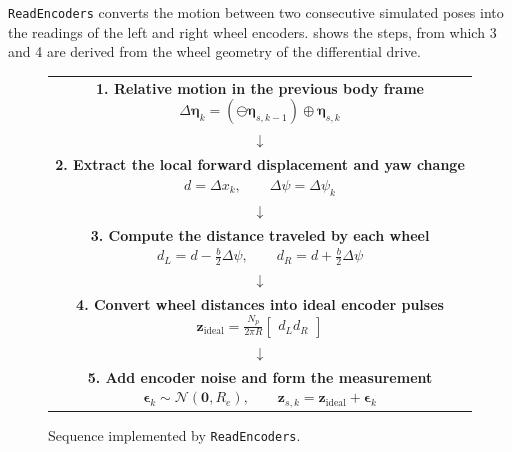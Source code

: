 \documentclass[letterpaper,12pt]{article}
\newcommand{\opluspose}{\mathbin{\oplus}}
\newcommand{\ominuspose}{\mathbin{\ominus}}
\begin{document}
\texttt{ReadEncoders} converts the motion between two consecutive simulated
poses into the readings of the left and right wheel encoders.
 shows the steps, from which 3 and 4 are derived from the wheel geometry of the
differential drive.

\begin{figure}[H]
    \centering
    \small
    \begin{tabular}{c}
        \fbox{\parbox{0.82\textwidth}{\centering
        \textbf{1. Relative motion in the previous body frame}\\[-0.1em]
        $\displaystyle
        \Delta\boldsymbol{\eta}_k=
        (\ominuspose\boldsymbol{\eta}_{s,k-1})
        \opluspose\boldsymbol{\eta}_{s,k}$}}\\[0.25em]
        $\downarrow$\\[0.25em]
        \fbox{\parbox{0.82\textwidth}{\centering
        \textbf{2. Extract the local forward displacement and yaw change}\\[-0.1em]
        $\displaystyle d=\Delta x_k,\qquad
        \Delta\psi=\Delta\psi_k$}}\\[0.25em]
        $\downarrow$\\[0.25em]
        \fbox{\parbox{0.82\textwidth}{\centering
        \textbf{3. Compute the distance traveled by each wheel}\\[-0.1em]
        $\displaystyle d_L=d-\frac{b}{2}\Delta\psi,\qquad
        d_R=d+\frac{b}{2}\Delta\psi$}}\\[0.25em]
        $\downarrow$\\[0.25em]
        \fbox{\parbox{0.82\textwidth}{\centering
        \textbf{4. Convert wheel distances into ideal encoder pulses}\\[-0.1em]
        $\displaystyle
        \boldsymbol{z}_{\mathrm{ideal}}=
        \frac{N_p}{2\pi R}
        \begin{bmatrix}d_L\\d_R\end{bmatrix}$}}\\[0.25em]
        $\downarrow$\\[0.25em]
        \fbox{\parbox{0.82\textwidth}{\centering
        \textbf{5. Add encoder noise and form the measurement}\\[-0.1em]
        $\displaystyle
        \boldsymbol{\epsilon}_k\sim\mathcal{N}(\boldsymbol{0},R_e),\qquad
        \boldsymbol{z}_{s,k}=\boldsymbol{z}_{\mathrm{ideal}}+
        \boldsymbol{\epsilon}_k$}}
    \end{tabular}
    \caption{Sequence implemented by \texttt{ReadEncoders}.}
    \label{fig:encoder-flow}
\end{figure}
\end{document}
